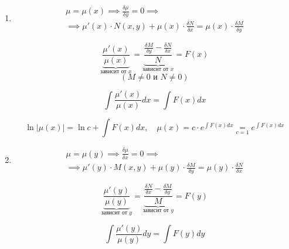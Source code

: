 \documentclass[11pt,a4paper,oneside]{report}
\theoremstyle{definition}
\theoremstyle{plain}
\theoremstyle{remark}
\begin{document}
\begin{enumerate}
    \item \begin{multline*}
              \mu = \mu(x) \implies \frac{\delta \mu}{\delta y} = 0 \implies \\
              \implies \mu'(x) \cdot N(x,y) + \mu(x)\cdot \frac{\delta N}{\delta x} = \mu(x)\cdot \frac{\delta M}{\delta y}
          \end{multline*}

          \begin{equation*}
              \underbrace{\frac{\mu'(x)}{\mu(x)}}_{\text{зависит от }x} = \underbrace{\frac{\frac{\delta M}{\delta y} - \frac{\delta N}{\delta x}}{N}}_{\text{зависит от }x} = F(x)
          \end{equation*}
          \begin{equation*}
              \left(M\ne0\text{ и }N\ne0\right)
          \end{equation*}

          \begin{equation*}
              \int\frac{\mu'(x)}{\mu(x)}dx = \int F(x)dx
          \end{equation*}

          \begin{equation*}
              \ln|\mu(x)| = \ln c + \int F(x)dx, \quad \mu(x) = c\cdot e^{\int F(x)dx} \underset{c = 1}{=} e^{\int F(x)dx}
          \end{equation*}

    \item \begin{multline*}
              \mu = \mu(y) \implies \frac{\delta \mu}{\delta x} = 0 \implies \\
              \implies \mu'(y) \cdot M(x,y) + \mu(y)\cdot \frac{\delta M}{\delta y} = \mu(y)\cdot \frac{\delta N}{\delta x}
          \end{multline*}

          \begin{equation*}
              \underbrace{\frac{\mu'(y)}{\mu(y)}}_{\text{зависит от }y} = \underbrace{\frac{\frac{\delta N}{\delta x} - \frac{\delta M}{\delta y}}{M}}_{\text{зависит от }y} = F(y)
          \end{equation*}

          \begin{equation*}
              \int\frac{\mu'(y)}{\mu(y)}dy = \int F(y)dy
          \end{equation*}


\end{enumerate}
\end{document}
